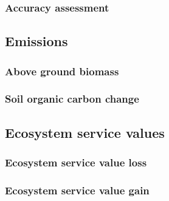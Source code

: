 		\subsubsection{Accuracy assessment}
			\lipsum[1-2]

	\subsection{Emissions}
		\subsubsection{Above ground biomass}
			\lipsum[1-2]
		\subsubsection{Soil organic carbon change}
			\lipsum[1-2]

	\subsection{Ecosystem service values}
		\subsubsection{Ecosystem service value loss}
			\lipsum[1-2]
		\subsubsection{Ecosystem service value gain}
			\lipsum[1]

